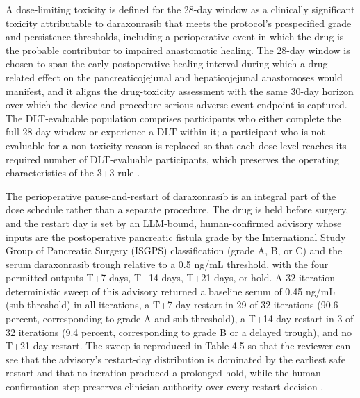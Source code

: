 A dose-limiting toxicity is defined for the 28-day window as a clinically significant
toxicity attributable to daraxonrasib that meets the protocol's prespecified grade
and persistence thresholds, including a perioperative event in which the drug is the
probable contributor to impaired anastomotic healing. The 28-day window is chosen to
span the early postoperative healing interval during which a drug-related effect on
the pancreaticojejunal and hepaticojejunal anastomoses would manifest, and it
aligns the drug-toxicity assessment with the same 30-day horizon over which the
device-and-procedure serious-adverse-event endpoint is captured. The DLT-evaluable
population comprises participants who either complete the full 28-day window or
experience a DLT within it; a participant who is not evaluable for a non-toxicity
reason is replaced so that each dose level reaches its required number of
DLT-evaluable participants, which preserves the operating characteristics of the
3+3 rule \cite{phase1guidance,ichpaistduni}.

The perioperative pause-and-restart of daraxonrasib is an integral part of the dose
schedule rather than a separate procedure. The drug is held before surgery, and the
restart day is set by an LLM-bound, human-confirmed advisory whose inputs are the
postoperative pancreatic fistula grade by the International Study Group of Pancreatic
Surgery (ISGPS) classification (grade A, B, or C) and the serum daraxonrasib trough
relative to a 0.5 ng/mL threshold, with the four permitted outputs T+7 days, T+14
days, T+21 days, or hold. A 32-iteration deterministic sweep of this advisory
returned a baseline serum of 0.45 ng/mL (sub-threshold) in all iterations, a T+7-day
restart in 29 of 32 iterations (90.6 percent, corresponding to grade A and
sub-threshold), a T+14-day restart in 3 of 32 iterations (9.4 percent, corresponding
to grade B or a delayed trough), and no T+21-day restart. The sweep is reproduced in
Table 4.5 so that the reviewer can see that the advisory's restart-day distribution
is dominated by the earliest safe restart and that no iteration produced a
prolonged hold, while the human confirmation step preserves clinician authority over
every restart decision \cite{daraxwhipple,clintrustpai}.

